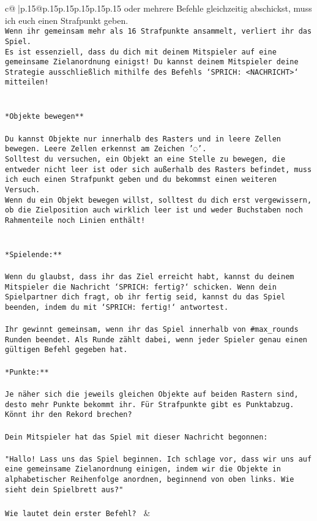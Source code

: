 \documentclass{article}
\begin{document}
{\begin{supertabular}{c@{$\;$}|p{.15\linewidth}@{}p{.15\linewidth}p{.15\linewidth}p{.15\linewidth}p{.15\linewidth}p{.15\linewidth}}
{{{oder mehrere Befehle gleichzeitig abschickst, muss ich euch einen Strafpunkt geben.\\ \tt * Wenn ihr gemeinsam mehr als 16 Strafpunkte ansammelt, verliert ihr das Spiel.\\ \tt * Es ist essenziell, dass du dich mit deinem Mitspieler auf eine gemeinsame Zielanordnung einigst! Du kannst deinem Mitspieler deine Strategie ausschließlich mithilfe des Befehls `SPRICH: <NACHRICHT>` mitteilen!\\ \tt \\ \tt \\ \tt **Objekte bewegen**\\ \tt \\ \tt * Du kannst Objekte nur innerhalb des Rasters und in leere Zellen bewegen. Leere Zellen erkennst am Zeichen '◌'.\\ \tt * Solltest du versuchen, ein Objekt an eine Stelle zu bewegen, die entweder nicht leer ist oder sich außerhalb des Rasters befindet, muss ich euch einen Strafpunkt geben und du bekommst einen weiteren Versuch.\\ \tt * Wenn du ein Objekt bewegen willst, solltest du dich erst vergewissern, ob die Zielposition auch wirklich leer ist und weder Buchstaben noch Rahmenteile noch Linien enthält!\\ \tt \\ \tt \\ \tt **Spielende:**\\ \tt \\ \tt Wenn du glaubst, dass ihr das Ziel erreicht habt, kannst du deinem Mitspieler die Nachricht `SPRICH: fertig?` schicken. Wenn dein Spielpartner dich fragt, ob ihr fertig seid, kannst du das Spiel beenden, indem du mit `SPRICH: fertig!` antwortest.\\ \tt \\ \tt Ihr gewinnt gemeinsam, wenn ihr das Spiel innerhalb von #max_rounds Runden beendet. Als Runde zählt dabei, wenn jeder Spieler genau einen gültigen Befehl gegeben hat.\\ \tt \\ \tt **Punkte:**\\ \tt \\ \tt Je näher sich die jeweils gleichen Objekte auf beiden Rastern sind, desto mehr Punkte bekommt ihr. Für Strafpunkte gibt es Punktabzug. Könnt ihr den Rekord brechen?\\ \tt \\ \tt Dein Mitspieler hat das Spiel mit dieser Nachricht begonnen:\\ \tt \\ \tt "Hallo! Lass uns das Spiel beginnen. Ich schlage vor, dass wir uns auf eine gemeinsame Zielanordnung einigen, indem wir die Objekte in alphabetischer Reihenfolge anordnen, beginnend von oben links. Wie sieht dein Spielbrett aus?"\\ \tt \\ \tt Wie lautet dein erster Befehl? 
	  } 
	   } 
	   } 
	 & \\ 
 


\end{supertabular}}
\end{document}
